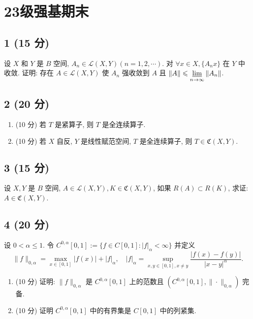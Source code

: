 \documentclass[11pt, a4paper]{ctexart}
\newenvironment{problem}[1]
{\subsection*{#1}}
{}
\begin{document}
	
	\section*{23级强基期末}
	
	\vspace{1cm}
	
	\begin{problem}{1 (15 分)}
		设 $X$ 和 $Y$ 是 $B$ 空间, $A_n \in \mathscr{L}(X, Y)(n=1, 2, \cdots)$. 对 $\forall x \in X, \{A_n x\}$ 在 $Y$ 中收敛. 证明: 存在 $A \in \mathscr{L}(X, Y)$ 使 $A_n$ 强收敛到 $A$ 且 $\|A\| \leqslant \varliminf\limits_{n\to\infty} \|A_n\|$.
	\end{problem}
	
	\vspace{0.5cm}
	
	\begin{problem}{2 (20 分)}
		\begin{enumerate}
			\item (10 分) 若 $T$ 是紧算子, 则 $T$ 是全连续算子.
			\item (10 分) 若 $X$ 自反, $Y$ 是线性赋范空间, $T$ 是全连续算子, 则 $T \in \mathfrak{C}(X, Y)$.
		\end{enumerate}
	\end{problem}
	
	\vspace{0.5cm}
	
	\begin{problem}{3 (15 分)}
		设 $X, Y$ 是 $B$ 空间, $A \in \mathscr{L}(X, Y), K \in \mathfrak{C}(X, Y)$, 如果 $R(A) \subset R(K)$, 求证: $A \in \mathfrak{C}(X, Y)$.
	\end{problem}
	
	\vspace{0.5cm}
	
	\begin{problem}{4 (20 分)}
		设 $0 < \alpha \leqslant 1$. 令 $C^{0,\alpha}[0, 1] := \{f \in C[0, 1] : |f|_\alpha < \infty \}$ 并定义
		$$
		\|f\|_{0,\alpha} = \max_{x\in[0,1]} |f(x)| + |f|_\alpha, \quad |f|_\alpha = \sup_{x,y\in[0,1], x\neq y} \frac{|f(x) - f(y)|}{|x - y|^\alpha}.
		$$
		\begin{enumerate}
			\item (10 分) 证明: $\|f\|_{0,\alpha}$ 是 $C^{0,\alpha}[0, 1]$ 上的范数且 $(C^{0,\alpha}[0, 1], \|\cdot\|_{0,\alpha})$ 完备.
			\item (10 分) 证明 $C^{0,\alpha}[0, 1]$ 中的有界集是 $C[0, 1]$ 中的列紧集.
		\end{enumerate}
	\end{problem}
	
\end{document}
